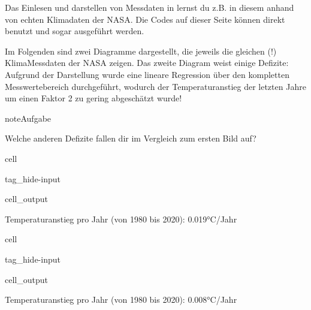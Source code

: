 \documentclass[letterpaper,10pt,english]{jupyterBook}
\begin{document}
\nopagebreak


\sphinxAtStartPar
Das Einlesen und darstellen von Messdaten in  lernst du z.B. in diesem {\hyperref[\detokenize{content/T_Plotten::doc}]{}} anhand von echten Klimadaten der NASA. Die Codes auf dieser Seite können direkt benutzt und sogar ausgeführt werden.



\sphinxAtStartPar
Im Folgenden sind zwei Diagramme dargestellt, die jeweils die gleichen (!) Klima\sphinxhyphen{}Messdaten der NASA zeigen. Das zweite Diagram weist einige Defizite: Aufgrund der Darstellung wurde eine lineare Regression über den kompletten Messwertebereich durchgeführt, wodurch der Temperaturanstieg der letzten Jahre um einen Faktor 2 zu gering abgeschätzt wurde!

\begin{sphinxadmonition}{note}{Aufgabe}

\sphinxAtStartPar
Welche anderen Defizite fallen dir im Vergleich zum ersten Bild auf?
\end{sphinxadmonition}

\begin{sphinxuseclass}{cell}
\begin{sphinxuseclass}{tag_hide-input}\begin{sphinxVerbatimOutput}

\begin{sphinxuseclass}{cell_output}
\begin{sphinxVerbatim}[commandchars=\\\{\}]
Temperaturanstieg pro Jahr (von 1980 bis 2020): 0.019°C/Jahr
\end{sphinxVerbatim}

\noindent{}

\end{sphinxuseclass}\end{sphinxVerbatimOutput}

\end{sphinxuseclass}
\end{sphinxuseclass}
\begin{sphinxuseclass}{cell}
\begin{sphinxuseclass}{tag_hide-input}\begin{sphinxVerbatimOutput}

\begin{sphinxuseclass}{cell_output}
\begin{sphinxVerbatim}[commandchars=\\\{\}]
Temperaturanstieg pro Jahr (von 1980 bis 2020): 0.008°C/Jahr
\end{sphinxVerbatim}

\noindent{}

\end{sphinxuseclass}\end{sphinxVerbatimOutput}

\end{sphinxuseclass}
\end{sphinxuseclass}
\end{document}
